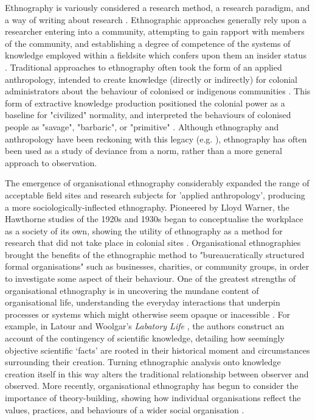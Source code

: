 Ethnography is variously considered a research method, a research paradigm, and a way of writing about research \citep{bate_whatever_1997}. Ethnographic approaches generally rely upon a researcher entering into a community, attempting to gain rapport with members of the community, and establishing a degree of competence of the systems of knowledge employed within a fieldsite which confers upon them an insider status \citep{atkinson_ethnographic_2017}.  Traditional approaches to ethnography often took the form of an applied anthropology, intended to create knowledge (directly or indirectly) for colonial administrators about the behaviour of colonised or indigenous communities \citep{baba_end_2005}.  This form of extractive knowledge production positioned the colonial power as a baseline for "civilized" normality, and interpreted the behaviours of colonised people as "savage", "barbaric", or "primitive" \citep{hsu_rethinking_1964}. Although ethnography and anthropology have been reckoning with this legacy (e.g. \citep{manning_constructing_2016}), ethnography has often been used as a study of deviance from a norm, rather than a more general approach to observation.  

The emergence of organisational ethnography considerably expanded the range of acceptable field sites and research subjects for 'applied anthropology', producing a more sociologically-inflected ethnography. Pioneered by Lloyd Warner, the Hawthorne studies of the 1920s and 1930s began to conceptualise the workplace as a society of its own, showing the utility of ethnography as a method for research that did not take place in colonial sites \citep{neyland_organizational_2007}. Organisational ethnographies brought the benefits of the ethnographic method to "bureaucratically structured formal organisations" \citep{watson_making_2012} such as businesses, charities, or community groups, in order to investigate some aspect of their behaviour. One of the greatest strengths of organisational ethnography is in uncovering the mundane content of organisational life, understanding the everyday interactions that underpin processes or systems which might otherwise seem opaque or inacessible \citep{bate_whatever_1997}. For example, in Latour and Woolgar's \textit{Labatory Life} \citep{latour_laboratory_1986}, the authors construct an account of the contingency of scientific knowledge, detailing how seemingly objective scientific ‘facts’ are rooted in their historical moment and circumstances surrounding their creation. Turning ethnographic analysis onto knowledge creation itself in this way alters the traditional relationship between observer and observed. More recently, organisational ethnography has begun to consider the importance of theory-building, showing how individual organisations reflect the values, practices, and behaviours of a wider social organisation \citep{watson_making_2012}. 

